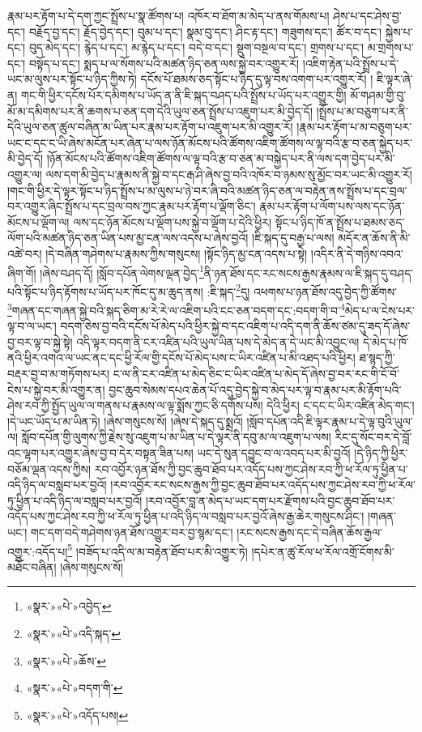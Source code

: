 རྣམ་པར་རྟོག་པ་དེ་དག་ཀྱང་སྤྲོས་པ་སྣ་ཚོགས་པ། འཁོར་བ་ཐོག་མ་མེད་པ་ནས་གོམས་པ། ཤེས་པ་དང་ཤེས་བྱ་དང་། བརྗོད་བྱ་དང་། རྗོད་བྱེད་དང་། བུམ་པ་དང་། སྣམ་བུ་དང་། ཤིང་རྟ་དང་། གཟུགས་དང་། ཚོར་བ་དང་། སྐྱེས་པ་དང་། བུད་མེད་དང་། རྙེད་པ་དང་། མ་རྙེད་པ་དང་། བདེ་བ་དང་། སྡུག་བསྔལ་བ་དང་། གྲགས་པ་དང་། མ་གྲགས་པ་དང་། བསྟོད་པ་དང་། སྨད་པ་ལ་སོགས་པའི་མཚན་ཉིད་ཅན་ལས་སྐྱེ་བར་འགྱུར་རོ། །འཇིག་རྟེན་པའི་སྤྲོས་པ་དེ་ཡང་མ་ལུས་པར་སྟོང་པ་ཉིད་ཀྱིས་ཏེ། དངོས་པོ་ཐམས་ཅད་སྟོང་པ་ཉིད་དུ་ལྟ་བས་འགག་པར་འགྱུར་རོ། །
ཇི་ལྟར་ཞེ་ན། གང་གི་ཕྱིར་དངོས་པོར་དམིགས་པ་ཡོད་ན་ནི་ཇི་སྐད་བཤད་པའི་སྤྲོས་པ་ཡོད་པར་འགྱུར་གྱི། མོ་གཤམ་གྱི་བུ་མོ་མ་དམིགས་པར་ནི་ཆགས་པ་ཅན་དག་དེའི་ཡུལ་ཅན་སྤྲོས་པ་འཇུག་པར་མི་བྱེད་དོ། །སྤྲོས་པ་མ་བཅུག་པར་ནི་དེའི་ཡུལ་ཅན་ཚུལ་བཞིན་མ་ཡིན་པར་རྣམ་པར་རྟོག་པ་འཇུག་པར་མི་འགྱུར་རོ། །རྣམ་པར་རྟོག་པ་མ་བཅུག་པར་ཡང་ང་དང་ང་ཡི་ཞེས་མངོན་པར་ཞེན་པ་ལས་ཉོན་མོངས་པའི་ཚོགས་འཇིག་ཚོགས་ལ་ལྟ་བའི་རྩ་བ་ཅན་སྐྱེད་པར་མི་བྱེད་དོ། །ཉོན་མོངས་པའི་ཚོགས་འཇིག་ཚོགས་ལ་ལྟ་བའི་རྩ་བ་ཅན་མ་བསྐྱེད་པར་ནི་ལས་དག་བྱེད་པར་མི་འགྱུར་ལ། ལས་དག་མི་བྱེད་པ་རྣམས་ནི་སྐྱེ་བ་དང་རྒ་ཤི་ཞེས་བྱ་བའི་འཁོར་བ་ཉམས་སུ་མྱོང་བར་ཡང་མི་འགྱུར་རོ། །གང་གི་ཕྱིར་དེ་ལྟར་སྟོང་པ་ཉིད་སྤྲོས་པ་མ་ལུས་པ་ཉེ་བར་ཞི་བའི་མཚན་ཉིད་ཅན་ལ་བརྟེན་ནས་སྤྲོས་པ་དང་བྲལ་བར་འགྱུར་ཞིང་སྤྲོས་པ་དང་བྲལ་བས་ཀྱང་རྣམ་པར་རྟོག་པ་ལྡོག་ཅིང་། རྣམ་པར་རྟོག་པ་ལོག་པས་ལས་དང་ཉོན་མོངས་པ་ལྡོག་ལ། ལས་དང་ཉོན་མོངས་པ་ལྡོག་པས་སྐྱེ་བ་ལྡོག་པ་དེའི་ཕྱིར། སྟོང་པ་ཉིད་ཁོ་ན་སྤྲོས་པ་ཐམས་ཅད་ལོག་པའི་མཚན་ཉིད་ཅན་ཡིན་པས་མྱ་ངན་ལས་འདས་པ་ཞེས་བྱའོ། །ཇི་སྐད་དུ་བརྒྱ་པ་ལས། མདོར་ན་ཆོས་ནི་མི་འཚེ་བར། །དེ་བཞིན་གཤེགས་པ་རྣམས་ཀྱིས་གསུངས། །སྟོང་ཉིད་མྱ་ངན་འདས་པ་སྟེ། །འདིར་ནི་དེ་གཉིས་འབའ་ཞིག་གོ། །ཞེས་བཤད་དོ། །སློབ་དཔོན་ལེགས་ལྡན་བྱེད་\footnote{«སྣར་»«པེ་»འབྱེད་}ནི་ཉན་ཐོས་དང་རང་སངས་རྒྱས་རྣམས་ལ་ཇི་སྐད་དུ་བཤད་པའི་སྟོང་པ་ཉིད་རྟོགས་པ་ཡོད་པར་ཁོང་དུ་མ་ཆུད་ནས། :ཇི་སྐད་\footnote{«སྣར་»«པེ་»འདི་སྐད་}དུ། འཕགས་པ་ཉན་ཐོས་འདུ་བྱེད་ཀྱི་ཚོགས་\footnote{«སྣར་»«པེ་»ཆོས་}གཞན་དང་གཞན་སྐྱེ་བའི་སྐད་ཅིག་མ་རེ་རེ་ལ་འཇིག་པའི་ངང་ཅན་བདག་དང་:བདག་གི་བ་\footnote{«སྣར་»«པེ་»བདག་གི་}མེད་པ་ལ་ངེས་པར་ལྟ་བ་ལ་ཡང་། བདག་ཅེས་བྱ་བའི་དངོས་པོ་མེད་པའི་ཕྱིར་སྐྱེ་བ་དང་འཇིག་པ་འདི་དག་ནི་ཆོས་ཙམ་དུ་ཟད་དོ་ཞེས་བྱ་བར་ལྟ་བ་སྐྱེ་སྟེ། འདི་ལྟར་བདག་ནི་ངར་འཛིན་པའི་ཡུལ་ཡིན་པས་དེ་མེད་ན་དེ་ཡང་མི་འབྱུང་ལ། དེ་མེད་པ་ཁོ་ནའི་ཕྱིར་འགའ་ལ་ཡང་ནང་དང་ཕྱི་རོལ་གྱི་དངོས་པོ་མེད་པས་ང་ཡིར་འཛིན་པ་མི་འཐད་པའི་ཕྱིར། ཐ་སྙད་ཀྱི་བརྡར་བྱ་བ་མ་གཏོགས་པར། ང་ལ་ནི་ངར་འཛིན་པ་མེད་ཅིང་ང་ཡིར་འཛིན་པ་མེད་དོ་ཞེས་བྱ་བར་རང་གི་ངོ་བོ་ངེས་པ་སྐྱེ་བར་མི་འགྱུར་ན། བྱང་ཆུབ་སེམས་དཔའ་ཆེན་པོ་འདུ་བྱེད་སྐྱེ་བ་མེད་པར་ལྟ་བ་རྣམ་པར་མི་རྟོག་པའི་ཤེས་རབ་ཀྱི་སྤྱོད་ཡུལ་ལ་གནས་པ་རྣམས་ལ་ལྟ་སྨོས་ཀྱང་ཅི་དགོས་པས། དེའི་ཕྱིར། ང་དང་ང་ཡིར་འཛིན་མེད་གང་། །དེ་ཡང་ཡོད་པ་མ་ཡིན་ཏེ། །ཞེས་གསུངས་སོ། །ཞེས་དེ་སྐད་དུ་སྨྲའོ། །སློབ་དཔོན་འདི་ཇི་ལྟར་རྣམ་པ་དེ་ལྟ་བུའི་ཡུལ་ལ། སློབ་དཔོན་གྱི་ལུགས་ཀྱི་རྗེས་སུ་འཇུག་པ་མ་ཡིན་པ་དེ་ལྟར་ནི་དབུ་མ་ལ་འཇུག་པ་ལས། རིང་དུ་སོང་བར་དེ་བློ་འང་ལྷག་པར་འགྱུར་ཞེས་བྱ་བ་དེར་བསྟན་ཟིན་པས། ཡང་དེ་སུན་དབྱུང་བ་ལ་འབད་པར་མི་བྱའོ། །དེ་ཉིད་ཀྱི་ཕྱིར་བཅོམ་ལྡན་འདས་ཀྱིས། རབ་འབྱོར་ཉན་ཐོས་ཀྱི་བྱང་ཆུབ་ཐོབ་པར་འདོད་པས་ཀྱང་ཤེས་རབ་ཀྱི་ཕ་རོལ་ཏུ་ཕྱིན་པ་འདི་ཉིད་ལ་བསླབ་པར་བྱའོ། །རབ་འབྱོར་རང་སངས་རྒྱས་ཀྱི་བྱང་ཆུབ་ཐོབ་པར་འདོད་པས་ཀྱང་ཤེས་རབ་ཀྱི་ཕ་རོལ་ཏུ་ཕྱིན་པ་འདི་ཉིད་ལ་བསླབ་པར་བྱའོ། །རབ་འབྱོར་བླ་ན་མེད་པ་ཡང་དག་པར་རྫོགས་པའི་བྱང་ཆུབ་ཐོབ་པར་འདོད་པས་ཀྱང་ཤེས་རབ་ཀྱི་ཕ་རོལ་ཏུ་ཕྱིན་པ་འདི་ཉིད་ལ་བསླབ་པར་བྱའོ་ཞེས་རྒྱ་ཆེར་གསུངས་ཤིང་། །གཞན་ཡང་། གང་དག་བདེ་གཤེགས་ཉན་ཐོས་འགྱུར་བར་བྱ་སྙམ་དང་། །རང་སངས་རྒྱས་དང་དེ་བཞིན་ཆོས་རྒྱལ་འགྱུར་:འདོད་པ།\footnote{«སྣར་»«པེ་»འདོད་པས།} །བཟོད་པ་འདི་ལ་མ་བརྟེན་ཐོབ་པར་མི་འགྱུར་ཏེ། །དཔེར་ན་ཚུ་རོལ་ཕ་རོལ་འགྲོ་ངོགས་མི་མཐོང་བཞིན། །ཞེས་གསུངས་སོ། 